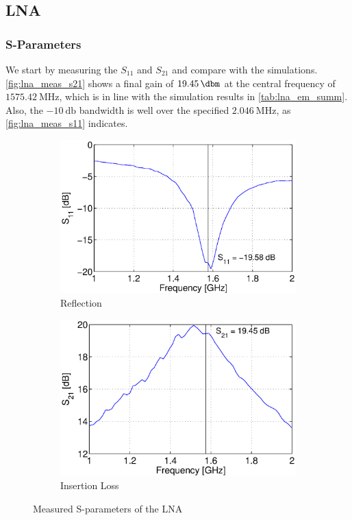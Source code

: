 \documentclass[a4paper]{article}        %
\begin{document}
	\subsection{LNA}
  \subsubsection{S-Parameters}
  \label{sub:sparams}
  We start by measuring the $S_{11}$ and $S_{21}$ and compare with the simulations.
  \autoref{fig:lna_meas_s21} shows a final gain of $\SI{19.45}{\dbm}$ at the central frequency of $\SI{1575.42}{\mega\hertz}$, which is in line with the simulation results in \autoref{tab:lna_em_summ}.
  Also, the $\SI{-10}{\decibel}$ bandwidth is well over the specified $\SI{2.046}{\mega\hertz}$, as \autoref{fig:lna_meas_s11} indicates.
  \begin{figure}[H]
    \centering
    \begin{subfigure}{0.5\textwidth}
      \centering
      \includegraphics[width=\textwidth]{fig/LNA/s11_lna.eps}
      \caption{Reflection}
      \label{fig:lna_meas_s11}
    \end{subfigure}%
    \begin{subfigure}{0.5\textwidth}
      \centering
      \includegraphics[width=\textwidth]{fig/LNA/s21_lna.eps}
      \caption{Insertion Loss}
      \label{fig:lna_meas_s21}
    \end{subfigure}
    \caption{Measured S-parameters of the LNA}
    \label{fig:lna_meas_sparam}
  \end{figure}
\end{document}

